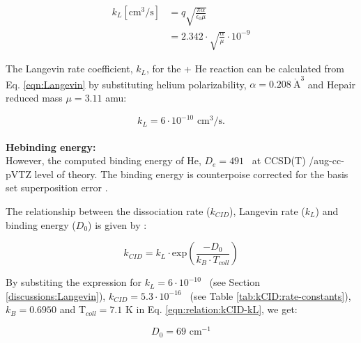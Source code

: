 \begin{equation}
    \begin{split}
        k_L [\text{cm}^3 / \text{s}] & = q \sqrt{\frac{\pi \alpha}{\epsilon _0 \mu}} \\
        &= 2.342 \cdot \sqrt{ \frac{\alpha}{\mu}} \cdot 10^{-9} 
   \end{split}
   \label{eqn:Langevin}
\end{equation}


The Langevin rate coefficient, $k_L$, for the \CD + He reaction can be calculated from Eq. \ref{eqn:Langevin} by substituting helium polarizability, $\alpha=0.208\  \mathring{\text{A}}^3$ \cite{olney_absolute_1997} and He\CD pair reduced mass $\mu=3.11$ amu:

\begin{equation}
        k_L = 6 \cdot 10^{-10} \text{ cm}^3 / \text{s}.
   \label{eqn:Langevin-CD+}
\end{equation}
\\
\textbf{He\CD binding energy:}\\

However, the computed binding energy of He\CD, $D_e=491$ \wn\ at CCSD(T) /aug-cc-pVTZ level of theory. The binding energy is counterpoise corrected for the basis set superposition error \cite{boys_calculation_1970}.
\label{discussions:binding-energy:CD+}

The relationship between the dissociation rate ($k_{CID}$), Langevin rate ($k_L$) and binding energy ($D_0$) is given by \cite{SGA2015}:

\begin{equation}
    k_{CID} = k_L \cdot \text{exp} \left( \frac{-D_0}{k_B \cdot T_{coll}} \right)
    \label{eqn:relation:kCID-kL} 
\end{equation}

By substiting the expression for $k_L=6 \cdot 10^{-10}$ \pers\ (see Section \ref{discussions:Langevin}), 
$k_{CID}=5.3 \cdot 10^{-16}$ \pers\ (see Table \ref{tab:kCID:rate-constants}), $k_B=0.6950$ \wnn 
and T$_{coll}=7.1$ K in Eq. \ref{eqn:relation:kCID-kL}, we get:

\begin{equation}
    D_0 = 69 \text{ cm}^{-1}
\end{equation}
